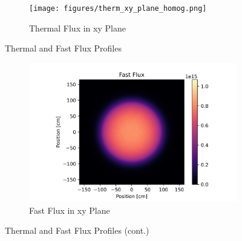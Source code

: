 \begin{figure}[H]
\centering

\begin{subfigure}{1.0\textwidth}
  \texttt{[image: figures/therm\_xy\_plane\_homog.png]}
  \caption{Thermal Flux in xy Plane}
  \label{fig:hom-plane-therm}
\end{subfigure}%

\caption{Thermal and Fast Flux Profiles}
\end{figure}

\begin{figure}[H]\ContinuedFloat
\centering

\begin{subfigure}{1.0\textwidth}
  \includegraphics[width=1.0\linewidth]{figures/fast_xy_plane_homog.png}
  \caption{Fast Flux in xy Plane}
  \label{fig:hom-plane-fast}
\end{subfigure}

%
\caption{Thermal and Fast Flux Profiles (cont.)}
\label{fig:hom-det-plane}
\end{figure}